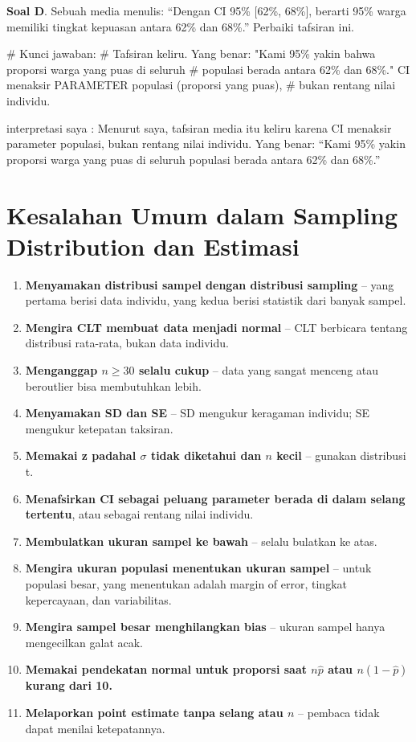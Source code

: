 \documentclass[
  indonesian,
  letterpaper,
]{book}
\newenvironment{Shaded}{\begin{snugshade}}{\end{snugshade}}
\newcommand{\CommentTok}[1]{\textcolor[rgb]{0.37,0.37,0.37}{#1}}
\providecommand{\tightlist}{%
  \setlength{\itemsep}{0pt}\setlength{\parskip}{0pt}}
\begin{document}
\textbf{Soal D}. Sebuah media menulis: ``Dengan CI 95\% {[}62\%,
68\%{]}, berarti 95\% warga memiliki tingkat kepuasan antara 62\% dan
68\%.'' Perbaiki tafsiran ini.

\begin{Shaded}
\begin{Highlighting}[]
\CommentTok{\# Kunci jawaban:}
\CommentTok{\# Tafsiran keliru. Yang benar: "Kami 95\% yakin bahwa proporsi warga yang puas di seluruh}
\CommentTok{\# populasi berada antara 62\% dan 68\%." CI menaksir PARAMETER populasi (proporsi yang puas),}
\CommentTok{\# bukan rentang nilai individu.}
\end{Highlighting}
\end{Shaded}

interpretasi saya : Menurut saya, tafsiran media itu keliru karena CI
menaksir parameter populasi, bukan rentang nilai individu. Yang benar:
``Kami 95\% yakin proporsi warga yang puas di seluruh populasi berada
antara 62\% dan 68\%.''

\section{Kesalahan Umum dalam Sampling Distribution dan
Estimasi}\label{kesalahan-umum-dalam-sampling-distribution-dan-estimasi}

\begin{enumerate}
\def\labelenumi{\arabic{enumi}.}
\tightlist
\item
  \textbf{Menyamakan distribusi sampel dengan distribusi sampling} --
  yang pertama berisi data individu, yang kedua berisi statistik dari
  banyak sampel.
\item
  \textbf{Mengira CLT membuat data menjadi normal} -- CLT berbicara
  tentang distribusi rata-rata, bukan data individu.
\item
  \textbf{Menganggap \(n \ge 30\) selalu cukup} -- data yang sangat
  menceng atau beroutlier bisa membutuhkan lebih.
\item
  \textbf{Menyamakan SD dan SE} -- SD mengukur keragaman individu; SE
  mengukur ketepatan taksiran.
\item
  \textbf{Memakai z padahal \(\sigma\) tidak diketahui dan \(n\) kecil}
  -- gunakan distribusi t.
\item
  \textbf{Menafsirkan CI sebagai peluang parameter berada di dalam
  selang tertentu}, atau sebagai rentang nilai individu.
\item
  \textbf{Membulatkan ukuran sampel ke bawah} -- selalu bulatkan ke
  atas.
\item
  \textbf{Mengira ukuran populasi menentukan ukuran sampel} -- untuk
  populasi besar, yang menentukan adalah margin of error, tingkat
  kepercayaan, dan variabilitas.
\item
  \textbf{Mengira sampel besar menghilangkan bias} -- ukuran sampel
  hanya mengecilkan galat acak.
\item
  \textbf{Memakai pendekatan normal untuk proporsi saat \(n\hat{p}\)
  atau \(n(1-\hat{p})\) kurang dari 10.}
\item
  \textbf{Melaporkan point estimate tanpa selang atau \(n\)} -- pembaca
  tidak dapat menilai ketepatannya.
\end{enumerate}
\end{document}
